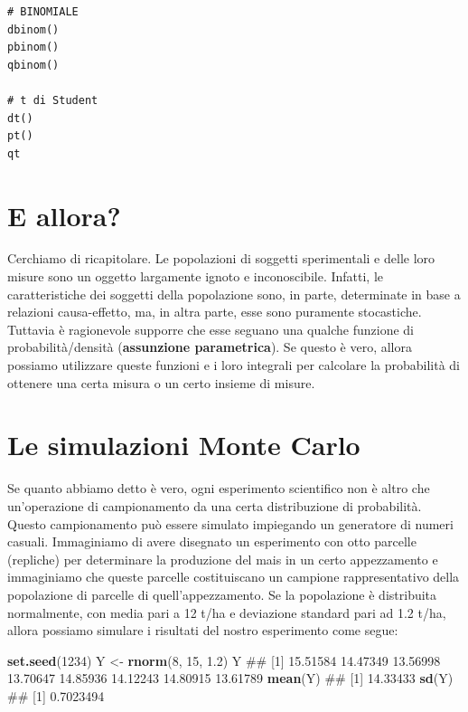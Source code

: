 \documentclass[a4paper,12pt,oneside]{book}
\newenvironment{Shaded}{\begin{snugshade}}{\end{snugshade}}
\newcommand{\KeywordTok}[1]{\textcolor[rgb]{0.13,0.29,0.53}{\textbf{#1}}}
\newcommand{\DecValTok}[1]{\textcolor[rgb]{0.00,0.00,0.81}{#1}}
\newcommand{\FloatTok}[1]{\textcolor[rgb]{0.00,0.00,0.81}{#1}}
\newcommand{\StringTok}[1]{\textcolor[rgb]{0.31,0.60,0.02}{#1}}
\newcommand{\NormalTok}[1]{#1}
\theoremstyle{definition}
\theoremstyle{definition}
\theoremstyle{definition}
\theoremstyle{remark}
\begin{document}
\begin{verbatim}
# BINOMIALE
dbinom()
pbinom()
qbinom()

# t di Student
dt()
pt()
qt
\end{verbatim}

\section{E allora?}\label{e-allora}

Cerchiamo di ricapitolare. Le popolazioni di soggetti sperimentali e
delle loro misure sono un oggetto largamente ignoto e inconoscibile.
Infatti, le caratteristiche dei soggetti della popolazione sono, in
parte, determinate in base a relazioni causa-effetto, ma, in altra
parte, esse sono puramente stocastiche. Tuttavia è ragionevole supporre
che esse seguano una qualche funzione di probabilità/densità
(\textbf{assunzione parametrica}). Se questo è vero, allora possiamo
utilizzare queste funzioni e i loro integrali per calcolare la
probabilità di ottenere una certa misura o un certo insieme di misure.

\section{Le simulazioni Monte Carlo}\label{le-simulazioni-monte-carlo}

Se quanto abbiamo detto è vero, ogni esperimento scientifico non è altro
che un'operazione di campionamento da una certa distribuzione di
probabilità. Questo campionamento può essere simulato impiegando un
generatore di numeri casuali. Immaginiamo di avere disegnato un
esperimento con otto parcelle (repliche) per determinare la produzione
del mais in un certo appezzamento e immaginiamo che queste parcelle
costituiscano un campione rappresentativo della popolazione di parcelle
di quell'appezzamento. Se la popolazione è distribuita normalmente, con
media pari a 12 t/ha e deviazione standard pari ad 1.2 t/ha, allora
possiamo simulare i risultati del nostro esperimento come segue:

\begin{Shaded}
\begin{Highlighting}[]
\KeywordTok{set.seed}\NormalTok{(}\DecValTok{1234}\NormalTok{)}
\NormalTok{Y <-}\StringTok{ }\KeywordTok{rnorm}\NormalTok{(}\DecValTok{8}\NormalTok{, }\DecValTok{15}\NormalTok{, }\FloatTok{1.2}\NormalTok{)}
\NormalTok{Y}
\NormalTok{## [1] 15.51584 14.47349 13.56998 13.70647 14.85936 14.12243 14.80915 13.61789}
\KeywordTok{mean}\NormalTok{(Y)}
\NormalTok{## [1] 14.33433}
\KeywordTok{sd}\NormalTok{(Y)}
\NormalTok{## [1] 0.7023494}
\end{Highlighting}
\end{Shaded}
\end{document}
